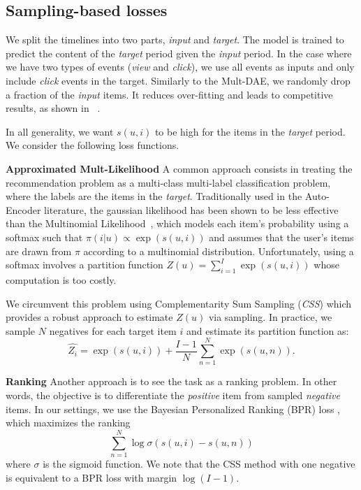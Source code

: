 \documentclass[sigconf]{acmart}
\begin{document}
\subsection{Sampling-based losses}
\label{subsec:training}





We split the timelines into two parts, \emph{input} and \emph{target}. The model is trained to predict the content of the \emph{target} period given the \emph{input} period. In the case where we have two types of events (\emph{view} and \emph{click}), we use all events as inputs and only include \emph{click} events in the target. Similarly to the Mult-DAE, we randomly drop a fraction of the \emph{input} items. It reduces over-fitting and leads to competitive results, as shown in ~\cite{variational-liang-2018}.

In all generality, we want $ s(u, i) $ to be high for the items in the \emph{target} period. We consider the following loss functions.










\textbf{Approximated Mult-Likelihood} A common approach consists in treating the recommendation problem as a multi-class multi-label classification problem, where the labels are the items in the \emph{target}. Traditionally used in the Auto-Encoder literature, the gaussian likelihood has been shown to be less effective than the Multinomial Likelihood~\cite{variational-liang-2018}, which models each item's probability using a softmax such that $ \pi(i | u) \propto \exp{(s(u, i))}$ and assumes that the user's items are drawn from $ \pi $ according to a multinomial distribution. Unfortunately, using a softmax involves a partition function $ Z(u) = \sum_{i=1}^I \exp{(s(u, i))} $ whose computation is too costly.





We circumvent this problem using Complementarity Sum Sampling (\emph{CSS}) \cite{pmlr-v54-botev17a} which provides a robust approach to estimate $ Z(u) $ via sampling. In practice, we sample $ N $ negatives for each target item $ i $ and estimate its partition function as:
$$
\widehat{Z_i} = \exp{(s(u, i))} + \frac{I - 1}{N} \sum_{n=1}^{N} \exp(s(u, n)).
$$

\textbf{Ranking} Another approach is to see the task as a ranking problem. In other words, the objective is to differentiate the \emph{positive} item from sampled \emph{negative} items. In our settings, we use the Bayesian Personalized Ranking (BPR) loss \cite{rendle2009bpr}, which maximizes the ranking
$$
\sum_{n=1}^N \log \sigma(s(u, i) - s(u, n))
$$
where $ \sigma $ is the sigmoid function. We note that the CSS method with one negative is equivalent to a BPR loss with margin $ \log(I - 1) $.
\end{document}
